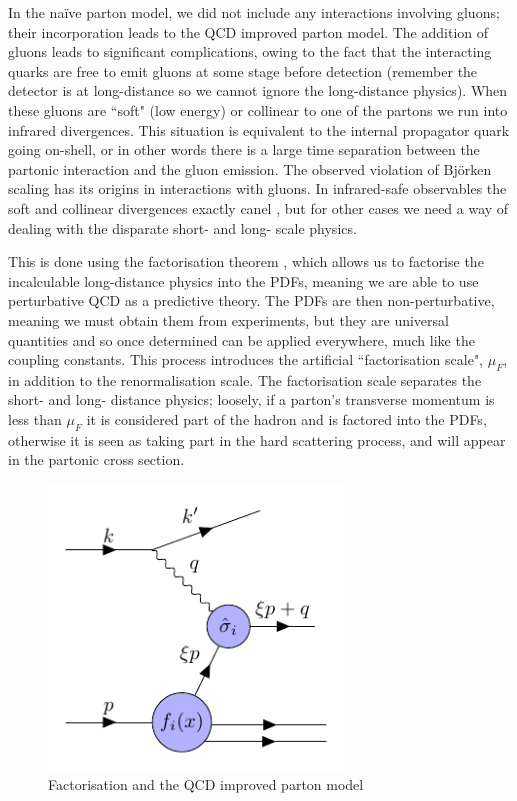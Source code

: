 In the na\"ive parton model, we did not include any interactions involving gluons; their incorporation leads to the QCD improved parton model. The addition of gluons leads to significant complications, owing to the fact that the interacting quarks are free to emit gluons at some stage before detection (remember the detector is at long-distance so we cannot ignore the long-distance physics). When these gluons are ``soft" (low energy) or collinear to one of the partons we run into infrared divergences. This situation is equivalent to the internal propagator quark going on-shell, or in other words there is a large time separation between the partonic interaction and the gluon emission. The observed violation of Bj\"orken scaling has its origins in interactions with gluons. In infrared-safe observables the soft and collinear divergences exactly canel \cite{Kinoshita:1962ur, Lee:1964is}, but for other cases we need a way of dealing with the disparate short- and long- scale physics. 

This is done using the factorisation theorem \cite{Collins:1989gx}, which allows us to factorise the incalculable long-distance physics into the PDFs, meaning we are able to use perturbative QCD as a predictive theory. The PDFs are then non-perturbative, meaning we must obtain them from experiments, but they are universal quantities and so once determined can be applied everywhere, much like the coupling constants. This process introduces the artificial ``factorisation scale", $\mu_F$, in addition to the renormalisation scale. The factorisation scale separates the short- and long- distance physics; loosely, if a parton's transverse momentum is less than $\mu_F$ it is considered part of the hadron and is factored into the PDFs, otherwise it is seen as taking part in the hard scattering process, and will appear in the partonic cross section.

\begin{figure}[H]
\centering
\includegraphics[width=0.7\textwidth]{../diagrams/improvedparton_dis.pdf}
\caption{\label{fig:improvedparton} Factorisation and the QCD improved parton model}
\end{figure}


